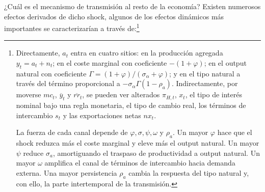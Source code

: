 \documentclass[10pt,a4paper]{article}
\begin{document}
¿Cuál es el mecanismo de transmisión al resto de la economía? Existen numerosos efectos derivados de dicho shock, algunos de los efectos dinámicos más importantes se caracterizarían a través de:\footnote{
  Directamente, $a_t$ entra en cuatro sitios: en la producción agregada $y_t=a_t+n_t$; en el coste marginal con coeficiente $-(1+\varphi)$; en el output natural con coeficiente $\Gamma=(1+\varphi)/(\sigma_\alpha+\varphi)$; y en el tipo natural a través del término proporcional a $-\sigma_\alpha\Gamma(1-\rho_a)$. Indirectamente, por moverse $mc_t$, $\overline{y}_t$ y $\overline{rr}_t$, se pueden ver alterados $\pi_{H,t}$, $x_t$, el tipo de interés nominal bajo una regla monetaria, el tipo de cambio real, los términos de intercambio $s_t$ y las exportaciones netas $nx_t$. 

La fuerza de cada canal depende de $\varphi, \sigma, \psi, \omega$ y $\rho_a$. Un mayor $\varphi$ hace que el shock reduzca más el coste marginal y eleve más el output natural. Un mayor $\psi$ reduce $\sigma_a$, amortiguando el traspaso de productividad a output natural. Un mayor $\omega$ amplifica el canal de términos de intercambio hacia demanda externa. Una mayor persistencia $\rho_a$ cambia la respuesta del tipo natural y, con ello, la parte intertemporal de la transmisión.
} 
\end{document}

